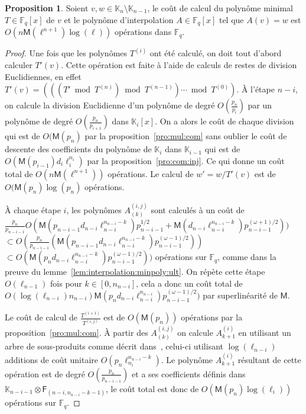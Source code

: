 \documentclass[10pt,a4paper]{book}
\theoremstyle{plain}
\theoremstyle{definition}
\theoremstyle{definition}
\theoremstyle{definition}
\newtheorem{prop}[thm]{Proposition}
\theoremstyle{definition}
\theoremstyle{remark}
\theoremstyle{remark}
\theoremstyle{definition}
\begin{document}
\begin{prop}
  Soient $v,w\in \mathbb{K}_n\setminus \mathbb{K}_{n-1}$, le coût de calcul du polynôme minimal
  $T\in \mathbb{F}_q[x]$ de $v$ et le polynôme d'interpolation $A\in 
  \mathbb{F}_q[x]$ tel que $A(v)=w$ est $O(n\mathsf{M}(\ell^{n+1})\log(\ell))$
  opérations dans $\mathbb{F}_q$.
\end{prop}
\begin{proof}
  Une fois que les polynômes $T^{(i)}$ ont été calculé, on doit tout d'abord 
  calculer $T'(v)$. Cette opération est faite à l'aide de calculs de restes de 
  division Euclidiennes, en effet
  $T'(v) = (((T' \bmod T^{(n)}) \bmod T^{(n-1)}) \cdots \bmod T^{(0)})$.
  \`A l'étape $n-i$, on calcule la division Euclidienne d'un polynôme de degré
   $O(\frac{p_n}{p_i})$ par un polynôme de degré $O(\frac{p_n}{p_{i+1}})$ dans  $\mathbb{K}_i[x]$. 
   On a alors le coût de chaque division qui est de $O(\mathsf{M}(p_n)$ 
   par la proposition~\ref{pro:mul:com} sans oublier le coût de descente des 
   coefficients du polynôme de $\mathbb{K}_i$ dans $\mathbb{K}_{i-1}$ qui est 
   de $O(\mathsf{M}(p_{i-1})d_i\ell_i^{n_i})$ par la proposition~\ref{pro:com:inj}.
   Ce qui donne un coût total de $O(n\mathsf{M}(\ell^{n+1}))$ opérations.
   Le calcul de $w'=w/T'(v)$ est de $O(\mathsf{M}(p_n)\log(p_n)$ opérations.

  \`A chaque étape $i$, les polynômes $A^{(i,j)}_{(k)}$ sont calculés à un coût de
  $\frac{p_n}{p_{n-i-1}}O(\mathsf{M}(p_{n-i-1}d_{n-i}\ell_{n-i}^{n_{n-i}-k})p_{n-i-1}^{1/2}+\mathsf{M}(d_{n-i}\ell_{n-i}^{n_{n-i}-k})p_{n-i-1}^{(\omega+1)/2}))$
  $\subset O(\frac{p_n}{p_{n-i-1}}(\mathsf{M}(p_{n-i-1}d_{n-i}\ell_{n-i}^{n_{n-i}-k})p_{n-i-1}^{(\omega-1)/2})) $
  $\subset O(\mathsf{M}(p_{n}d_{n-i}\ell_{n-i}^{n_{n-i}-k})p_{n-i-1}^{(\omega-1)/2}))$
  opérations sur $\mathbb{F}_q$, comme dans la preuve du  
  lemme~\ref{lem:interpolation:minpoly:ult}. On répète cette étape 
  $O(\ell_{n-1})$ fois pour $k \in [0,n_{n-i}]$, cela a donc un coût total de 
  $O(\log(\ell_{n-i})n_{n-i})\mathsf{M}(p_nd_{n-i}\ell_{n-i}^{n_{n-i}})p_{n-i-1}^{(\omega-1)/2})$
  par superlinéarité de $\mathsf{M}$.
  
  
  Le coût de calcul de $\frac{T^{(i+1)}}{T^{(i,j)}}$ est de 
  $O(\mathsf{M}(p_n))$ opérations  par la proposition~\ref{pro:mul:com}.
  \`A partir des $A^{(i,j)}_{(k)}$ on calcule $A^{(i)}_{k+1}$ en utilisant un arbre de 
  sous-produits comme décrit dans~\cite[Lemma~10.4]{vzGJG03}, celui-ci 
  utilisant $\log(\ell_{n-i})$ additions de coût unitaire 
  $O(p_n \ell_{n_i}^{n_{n-i}-k})$. Le polynôme $A^{(i)}_{k+1}$ résultant de 
  cette opération est de degré $O(\frac{p_n}{p_{n-i-1}})$ et a ses coefficients
  définis dans $\mathbb{K}_{n-i-1} \otimes \mathsf{F}_{(n-i,n_{n-i}-k-1)}$,
  le coût total est donc de $O(\mathsf{M}(p_n)\log(\ell_{i}))$ opérations sur 
  $\mathbb{F}_q$. 
    
\end{proof}
\end{document}
